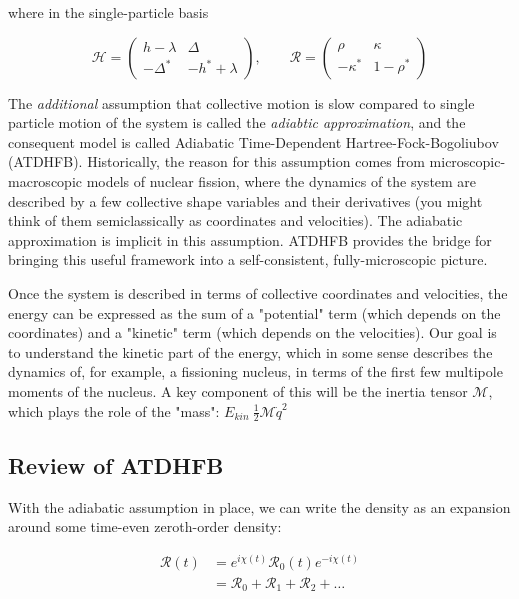 \noindent where in the single-particle basis

\begin{equation*}
\mathcal{H} = 
\left(\begin{array}{cc}
h-\lambda & \Delta \\
-\Delta^* & -h^*+\lambda
\end{array}\right), 
\qquad \mathcal{R} = 
\left(\begin{array}{cc}
\rho & \kappa \\
-\kappa^* & 1-\rho^*
\end{array}\right)
\end{equation*}

The \textit{additional} assumption that collective motion is slow compared to single particle motion of the system is called the \textit{adiabtic approximation}, and the consequent model is called Adiabatic Time-Dependent Hartree-Fock-Bogoliubov (ATDHFB). Historically, the reason for this assumption comes from microscopic-macroscopic models of nuclear fission, where the dynamics of the system are described by a few collective shape variables and their derivatives (you might think of them semiclassically as coordinates and velocities). The adiabatic approximation is implicit in this assumption. ATDHFB provides the bridge for bringing this useful framework into a self-consistent, fully-microscopic picture.

Once the system is described in terms of collective coordinates and velocities, the energy can be expressed as the sum of a "potential" term (which depends on the coordinates) and a "kinetic" term (which depends on the velocities). Our goal is to understand the kinetic part of the energy, which in some sense describes the dynamics of, for example, a fissioning nucleus, in terms of the first few multipole moments of the nucleus. A key component of this will be the inertia tensor $\mathcal{M}$, which plays the role of the "mass": $E_{kin}~\frac{1}{2}\mathcal{M}\dot{q}^2$

\subsection*{Review of ATDHFB}

With the adiabatic assumption in place, we can write the density as an expansion around some time-even zeroth-order density:

\begin{align*}
\mathcal{R}(t) &= e^{i\chi(t)}\mathcal{R}_0(t)e^{-i\chi(t)} \\
&= \mathcal{R}_0 + \mathcal{R}_1 + \mathcal{R}_2 + \dots
\end{align*}

